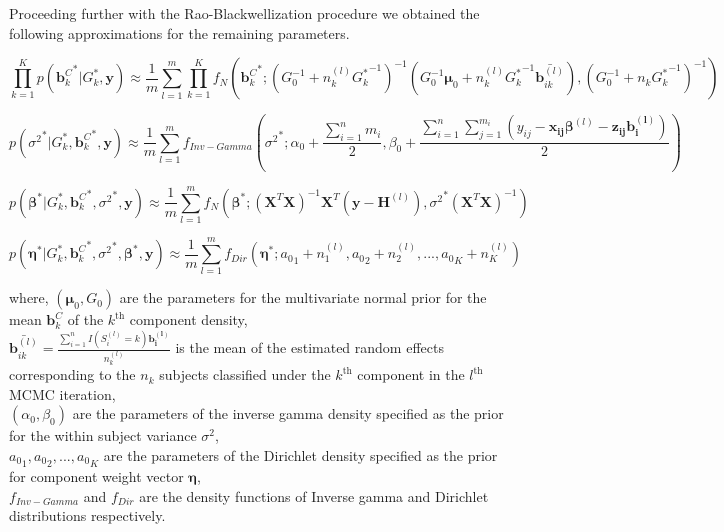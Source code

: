 Proceeding further with the Rao-Blackwellization procedure we obtained the following approximations for the remaining parameters.

\begin{equation}
\prod_{k=1}^K p({\boldsymbol{b}_k^C}^*|G_k^*, \boldsymbol{y}) \approx 
\frac 1 m \sum_{l=1}^m \prod_{k=1}^{K} f_N({\boldsymbol{b}_k^C}^*; (G_0^{-1} + n_k^{(l)} {G_k^*}^{-1})^{-1} (G_0^{-1}\boldsymbol{\mu}_0 + n_k^{(l)} {G_k^*}^{-1} \bar{\boldsymbol{b}_{ik}^{(l)}}) , (G_0^{-1} + n_k {G_k^*}^{-1})^{-1})
\end{equation}

\begin{equation}
p({\sigma^2}^*|G_k^*, {\boldsymbol{b}_k^C}^*, \boldsymbol{y}) \approx 
\frac 1 m \sum_{l=1}^m f_{Inv-Gamma}({\sigma^2}^*; \alpha_0 + \frac {\sum_{i=1}^n m_i} 2, 
\beta_0 + \frac {\sum_{i=1}^n \sum_{j=1}^{m_i} (y_{ij} - \boldsymbol{x_{ij}}\boldsymbol{\beta}^{(l)} - \boldsymbol{z_{ij}}\boldsymbol{b_i^{(l)}})} 2)
\end{equation}

\begin{equation}
p({\boldsymbol{\beta}}^*|G_k^*, {\boldsymbol{b}_k^C}^*, {\sigma^2}^*, \boldsymbol{y}) \approx 
\frac 1 m \sum_{l=1}^m f_N({\boldsymbol{\beta}}^*; (\boldsymbol{X}^T\boldsymbol{X})^{-1}\boldsymbol{X}^T(\boldsymbol{y} - {\boldsymbol{H}}^{(l)}), {\sigma^2}^*(\boldsymbol{X}^T\boldsymbol{X})^{-1})
\end{equation}

\begin{equation}
p({\boldsymbol{\eta}}^*|G_k^*, {\boldsymbol{b}_k^C}^*, {\sigma^2}^*,{\boldsymbol{\beta}}^*, \boldsymbol{y}) \approx 
\frac 1 m \sum_{l=1}^m f_{Dir}({\boldsymbol{\eta}}^*; {a_0}_1 + n_1^{(l)}, {a_0}_2 + n_2^{(l)}, ..., {a_0}_K + n_K^{(l)})
\end{equation}

where, 
$(\boldsymbol{\mu}_0, G_0)$ are the parameters for the multivariate normal prior for the mean $\boldsymbol{b}_k^C$ of the $k^\text{th}$ component density,\\
$\bar{\boldsymbol{b}_{ik}^{(l)}} = \frac {\sum_{i=1}^n I(S_i^{(l)}=k) \boldsymbol{b_i^{(l)}}} {n_k^{(l)}}$ is the mean of the estimated random effects corresponding to the $n_k$ subjects classified under the $k^\text{th}$ component in the $l^\text{th}$ MCMC iteration,\\
$(\alpha_0, \beta_0)$ are the parameters of the inverse gamma density specified as the prior for the within subject variance $\sigma^2$,\\
${a_0}_1, {a_0}_2,..., {a_0}_K$ are the parameters of the Dirichlet density specified as the prior for component weight vector $\boldsymbol{\eta}$,\\
$f_{Inv-Gamma}$ and $f_{Dir}$ are the density functions of Inverse gamma and Dirichlet distributions respectively.\\

